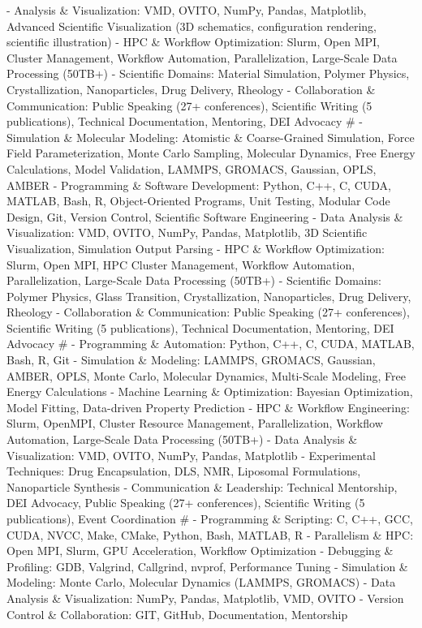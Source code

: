 - Analysis \& Visualization: VMD, OVITO, NumPy, Pandas, Matplotlib, Advanced Scientific Visualization (3D schematics, configuration rendering, scientific illustration)
- HPC \& Workflow Optimization: Slurm, Open MPI, Cluster Management, Workflow Automation, Parallelization, Large-Scale Data Processing (50TB+)
- Scientific Domains: Material Simulation, Polymer Physics, Crystallization, Nanoparticles, Drug Delivery, Rheology
- Collaboration \& Communication: Public Speaking (27+ conferences), Scientific Writing (5 publications), Technical Documentation, Mentoring, DEI Advocacy
#
- Simulation \& Molecular Modeling: Atomistic \& Coarse-Grained Simulation, Force Field Parameterization, Monte Carlo Sampling, Molecular Dynamics, Free Energy Calculations, Model Validation, LAMMPS, GROMACS, Gaussian, OPLS, AMBER
- Programming \& Software Development: Python, C++, C, CUDA, MATLAB, Bash, R, Object-Oriented Programs, Unit Testing, Modular Code Design, Git, Version Control, Scientific Software Engineering
- Data Analysis \& Visualization: VMD, OVITO, NumPy, Pandas, Matplotlib, 3D Scientific Visualization, Simulation Output Parsing
- HPC \& Workflow Optimization: Slurm, Open MPI, HPC Cluster Management, Workflow Automation, Parallelization, Large-Scale Data Processing (50TB+)
- Scientific Domains: Polymer Physics, Glass Transition, Crystallization, Nanoparticles, Drug Delivery, Rheology
- Collaboration \& Communication: Public Speaking (27+ conferences), Scientific Writing (5 publications), Technical Documentation, Mentoring, DEI Advocacy
#
- Programming \& Automation: Python, C++, C, CUDA, MATLAB, Bash, R, Git
- Simulation \& Modeling: LAMMPS, GROMACS, Gaussian, AMBER, OPLS, Monte Carlo, Molecular Dynamics, Multi-Scale Modeling, Free Energy Calculations
- Machine Learning \& Optimization: Bayesian Optimization, Model Fitting, Data-driven Property Prediction
- HPC \& Workflow Engineering: Slurm, OpenMPI, Cluster Resource Management, Parallelization, Workflow Automation, Large-Scale Data Processing (50TB+)
- Data Analysis \& Visualization: VMD, OVITO, NumPy, Pandas, Matplotlib
- Experimental Techniques: Drug Encapsulation, DLS, NMR, Liposomal Formulations, Nanoparticle Synthesis
- Communication \& Leadership: Technical Mentorship, DEI Advocacy, Public Speaking (27+ conferences), Scientific Writing (5 publications), Event Coordination
#
- Programming \& Scripting: C, C++, GCC, CUDA, NVCC, Make, CMake, Python, Bash, MATLAB, R
- Parallelism \& HPC: Open MPI, Slurm, GPU Acceleration, Workflow Optimization
- Debugging \& Profiling: GDB, Valgrind, Callgrind, nvprof, Performance Tuning
- Simulation \& Modeling: Monte Carlo, Molecular Dynamics (LAMMPS, GROMACS)
- Data Analysis \& Visualization: NumPy, Pandas, Matplotlib, VMD, OVITO
- Version Control \& Collaboration: GIT, GitHub, Documentation, Mentorship
